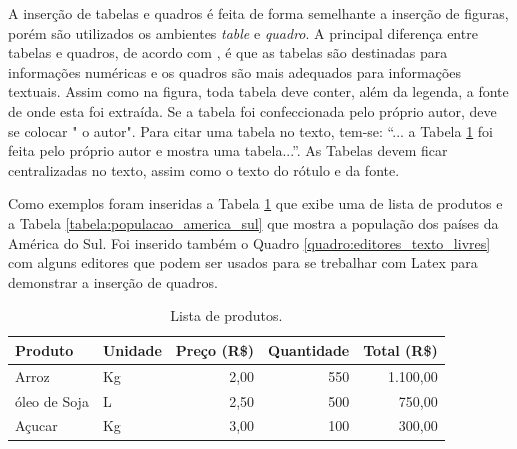 \documentclass{templateppgmo}
\numberwithin{figure}{chapter}
\numberwithin{table}{chapter}
\numberwithin{quadro}{chapter}
\numberwithin{algoritmo}{chapter}
\numberwithin{codigo}{chapter}
\begin{document}
A inserção de tabelas e quadros é feita de forma semelhante a inserção de figuras, porém são utilizados os ambientes \textit{table} e \textit{quadro}. A principal diferença entre tabelas e quadros, de acordo com , é que as tabelas são destinadas para informações numéricas e os quadros são mais adequados para informações textuais. Assim como na figura, toda tabela deve conter, além da legenda, a fonte de onde esta foi extraída. Se a tabela foi confeccionada pelo próprio autor, deve se colocar " o autor". Para citar uma tabela no texto, tem-se: ``... a Tabela \ref{tabela:lista_produtos} foi feita pelo próprio autor e mostra uma tabela...''. As Tabelas devem ficar centralizadas no texto, assim como o texto do rótulo e da fonte.

Como exemplos foram inseridas a Tabela \ref{tabela:lista_produtos} que exibe uma de lista de produtos e a Tabela \ref{tabela:populacao_america_sul} que mostra a população dos países da América do Sul. Foi inserido também o Quadro \ref{quadro:editores_texto_livres} com alguns editores que podem ser usados para se trebalhar com Latex para demonstrar a inserção de quadros.




\begin{table}[H]
\centering
\caption{Lista de produtos.}
\label{tabela:lista_produtos}
\begin{tabularx}{\textwidth}{X|l|r|r|r} \hline
Produto      & Unidade & Preço (R\$) & Quantidade & Total (R\$) \\ \hline
Arroz        & Kg      & 2,00        & 550        & 1.100,00    \\
óleo de Soja & L       & 2,50        & 500        & 750,00      \\
Açucar       & Kg      & 3,00        & 100        & 300,00      \\ \hline
\end{tabularx}

\end{table}
\end{document}
